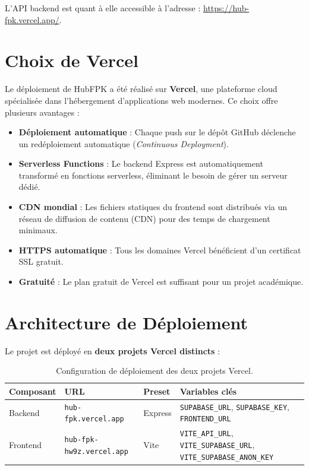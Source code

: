 \documentclass[12pt, a4paper]{report}
\begin{document}
L'API backend est quant à elle accessible à l'adresse : \url{https://hub-fpk.vercel.app/}.

\section{Choix de Vercel}

Le déploiement de HubFPK a été réalisé sur \textbf{Vercel}, une plateforme cloud spécialisée dans l'hébergement d'applications web modernes. Ce choix offre plusieurs avantages :

\begin{itemize}
    \item \textbf{Déploiement automatique} : Chaque push sur le dépôt GitHub déclenche un redéploiement automatique (\textit{Continuous Deployment}).
    \item \textbf{Serverless Functions} : Le backend Express est automatiquement transformé en fonctions serverless, éliminant le besoin de gérer un serveur dédié.
    \item \textbf{CDN mondial} : Les fichiers statiques du frontend sont distribués via un réseau de diffusion de contenu (CDN) pour des temps de chargement minimaux.
    \item \textbf{HTTPS automatique} : Tous les domaines Vercel bénéficient d'un certificat SSL gratuit.
    \item \textbf{Gratuité} : Le plan gratuit de Vercel est suffisant pour un projet académique.
\end{itemize}

\section{Architecture de Déploiement}

Le projet est déployé en \textbf{deux projets Vercel distincts} :

\begin{table}[H]
\centering
\renewcommand{\arraystretch}{1.3}
\begin{tabularx}{\textwidth}{l l l X}
\toprule
\textbf{Composant} & \textbf{URL} & \textbf{Preset} & \textbf{Variables clés} \\
\midrule
Backend & \texttt{hub-fpk.vercel.app} & Express & \texttt{SUPABASE\_URL}, \texttt{SUPABASE\_KEY}, \texttt{FRONTEND\_URL} \\
Frontend & \texttt{hub-fpk-hw9z.vercel.app} & Vite & \texttt{VITE\_API\_URL}, \texttt{VITE\_SUPABASE\_URL}, \texttt{VITE\_SUPABASE\_ANON\_KEY} \\
\bottomrule
\end{tabularx}
\caption{Configuration de déploiement des deux projets Vercel.}
\end{table}
\end{document}
